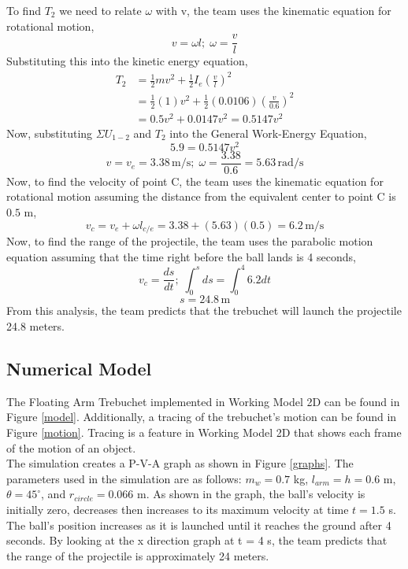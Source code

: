 \documentclass[12pt, titlepage]{article}
\begin{document}
    To find $T_2$ we need to relate $\omega$ with v, the team uses the kinematic equation for rotational motion,
    $$v = \omega l;\; \omega = \frac{v}{l}$$
    Substituting this into the kinetic energy equation,
    \begin{align*}
        T_2 &= \frac{1}{2}mv^2 + \frac{1}{2}I_e\left(\frac{v}{l}\right)^2 \\
        &= \frac{1}{2}(1)v^2 + \frac{1}{2}(0.0106)\left(\frac{v}{0.6}\right)^2 \\
        &= 0.5v^2 + 0.0147v^2 = 0.5147v^2
    \end{align*}
    Now, substituting $\Sigma U_{1-2}$ and $T_2$ into the General Work-Energy Equation,
    $$5.9 = 0.5147v^2$$
    $$v = v_e = 3.38 \, \mathrm{m/s};\; \omega = \frac{3.38}{0.6} = 5.63 \, \mathrm{rad/s}$$
    Now, to find the velocity of point C, the team uses the kinematic equation for rotational motion assuming the distance from the equivalent center to point C is $0.5$ m,
    $$v_c = v_e + \omega l_{c/e} = 3.38 + (5.63)(0.5) = 6.2 \, \mathrm{m/s}$$
    Now, to find the range of the projectile, the team uses the parabolic motion equation assuming that the time right before the ball lands is 4 seconds,
    $$v_c = \frac{ds}{dt};\; \displaystyle\int_{0}^{s}ds = \displaystyle\int_{0}^{4}6.2dt$$
    \[ \boxed{s = 24.8 \, \mathrm{m}} \]
    From this analysis, the team predicts that the trebuchet will launch the projectile 24.8 meters.
    \newpage
    \subsection{Numerical Model}
    The Floating Arm Trebuchet implemented in Working Model 2D can be found 
    in Figure \ref{model}. Additionally, a tracing of the trebuchet's motion 
    can be found in Figure \ref{motion}. Tracing is a feature in Working 
    Model 2D that shows each frame of the motion of an object.\\[5pt]
    The simulation creates a P-V-A graph as shown in Figure \ref{graphs}.
    The parameters used in the simulation are as follows: $m_{w} = 0.7$ kg, $l_{arm} = h = 0.6$ m,
    $\theta = 45^\circ$, and $r_{circle} = 0.066$ m. As shown in the graph, the ball's 
    velocity is initially zero, decreases then increases to its maximum velocity at time $t = 1.5$ s.
    The ball's position increases as it is launched until it reaches the ground after 4 seconds. By looking at the x direction graph at t = 4 s, 
    the team predicts that the range of the projectile is approximately 24 meters.
\end{document}
